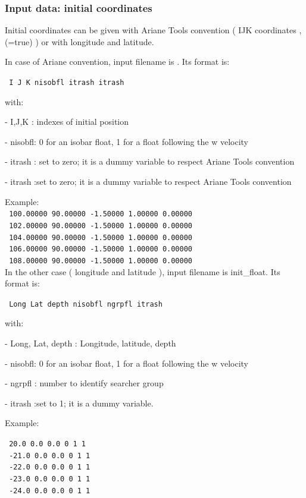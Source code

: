 \subsubsection{ Input data: initial coordinates }

Initial coordinates can be given with Ariane Tools convention ( IJK coordinates ,(=true) )
or with longitude and latitude.


In case of Ariane convention, input filename is . Its format is:

\texttt{ I J K nisobfl itrash itrash }

\noindent with: 

 - I,J,K  : indexes of initial position

 - nisobfl: 0 for an isobar float, 1 for a float following the w velocity  

 - itrash : set to zero; it is a dummy variable to respect Ariane Tools convention

 - itrash :set to zero; it is a dummy variable to respect Ariane Tools convention

\noindent Example:\\
\noindent \texttt{ 100.00000  90.00000  -1.50000 1.00000   0.00000}\\
\texttt{ 102.00000  90.00000  -1.50000 1.00000   0.00000}\\
\texttt{ 104.00000  90.00000  -1.50000 1.00000   0.00000}\\
\texttt{ 106.00000  90.00000  -1.50000 1.00000   0.00000}\\
\texttt{ 108.00000  90.00000  -1.50000 1.00000   0.00000}\\


In the other case ( longitude and latitude ), input filename is init\_float. Its format is:

\texttt{ Long Lat depth nisobfl ngrpfl itrash}

\noindent with:

 - Long, Lat, depth  : Longitude, latitude, depth

 - nisobfl: 0 for an isobar float, 1 for a float following the w velocity

 - ngrpfl : number to identify searcher group

 - itrash :set to 1; it is a dummy variable.

\noindent Example:

\noindent\texttt{  20.0 0.0 0.0 0 1 1 }\\
\texttt{ -21.0 0.0 0.0 0 1 1 }\\
\texttt{ -22.0 0.0 0.0 0 1 1 }\\
\texttt{ -23.0 0.0 0.0 0 1 1 }\\
\texttt{ -24.0 0.0 0.0 0 1 1 }\\

